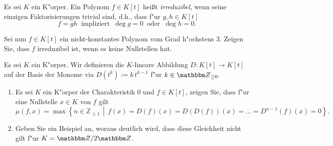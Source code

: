 \documentclass[a4,11pt]{article}
\begin{document}
\vspace*{-17mm}
{
\kopf
}


\begin{aufgabe}[4 Punkte]
Es sei $K$ ein K"orper. Ein Polynom $f\in K[t]$ heißt
\emph{irreduzibel}, wenn seine einzigen Faktorisierungen trivial sind,
d.h., dass f"ur $g,h \in K[t]$
\[
f = gh \ \text{ impliziert } \ \deg g = 0 \ \text{ oder } \ \deg h = 0.
\]


Sei nun $f\in K[t]$ ein nicht-konstantes Polynom
vom Grad h"ochstens $3$. Zeigen Sie, dass $f$ irreduzibel ist, wenn es
keine Nullstellen hat.

\end{aufgabe}

\begin{aufgabe}[4 Punkte]
Es sei $K$ ein K"orper. Wir definieren die $K$-lineare Abbildung $D
\colon K[t] \to K[t]$ auf der Basis der Monome via $D(t^k) := k\,t^{k-1}$
f"ur $k \in \Z_{\ge 0}$. 
  
\begin{enumerate}
\item Es sei $K$ ein K"orper der Charakteristik $0$ und $f \in K[t]$, zeigen Sie, dass f"ur eine Nullstelle $x\in K$ von $f$ gilt
\[
\mu(f,x) = \max \left\{ n \in \mathbb{Z}_{\geq 1} \,\middle|\, f(x) = D(f)(x) =
D(D(f))(x) = \ldots = D^{n-1}(f)(x) = 0 \right\}.
\]
\item Geben Sie ein Beispiel an, woraus deutlich wird, dass diese Gleichheit nicht gilt f"ur $K = \Z/2\Z$.
\end{enumerate}

\end{aufgabe}
\end{document}
